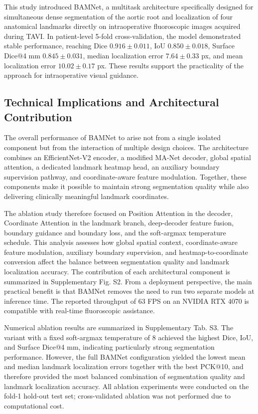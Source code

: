 \documentclass[utf8]{FrontiersinHarvard}
\begin{document}
This study introduced BAMNet, a multitask architecture specifically designed for simultaneous dense segmentation of the aortic 
root and localization of four anatomical landmarks directly on intraoperative fluoroscopic images acquired during TAVI. In 
patient-level 5-fold cross-validation, the model demonstrated stable performance, reaching Dice $0.916 \pm 0.011$, IoU 
$0.850 \pm 0.018$, Surface Dice@4 mm $0.845 \pm 0.031$, median localization error $7.64 \pm 0.33$ px, and mean localization 
error $10.02 \pm 0.17$ px. These results support the practicality of the approach for intraoperative visual guidance.

\subsection{Technical Implications and Architectural Contribution}

The overall performance of BAMNet to arise not from a single isolated component but from the interaction of multiple design 
choices. The architecture combines an EfficientNet-V2 encoder, a modified MA-Net decoder, global spatial attention, a 
dedicated landmark heatmap head, an auxiliary boundary supervision pathway, and coordinate-aware feature modulation. Together, 
these components make it possible to maintain strong segmentation quality while also delivering clinically meaningful landmark coordinates.

The ablation study therefore focused on Position Attention in the decoder, Coordinate Attention in the landmark branch, deep-decoder 
feature fusion, boundary guidance and boundary loss, and the soft-argmax temperature schedule. This analysis assesses how global 
spatial context, coordinate-aware feature modulation, auxiliary boundary supervision, and heatmap-to-coordinate conversion affect 
the balance between segmentation quality and landmark localization accuracy. The contribution of each architectural component is 
summarized in Supplementary Fig. S2. From a deployment perspective, the main practical benefit is that BAMNet removes the need to 
run two separate models at inference time. The reported throughput of 63 FPS on an NVIDIA RTX 4070 is compatible with real-time fluoroscopic assistance.

Numerical ablation results are summarized in Supplementary Tab. S3. The variant with a fixed soft-argmax temperature of 8 achieved 
the highest Dice, IoU, and Surface Dice@4 mm, indicating particularly strong segmentation performance. However, the full BAMNet 
configuration yielded the lowest mean and median landmark localization errors together with the best PCK@10, and therefore provided 
the most balanced combination of segmentation quality and landmark localization accuracy. All ablation experiments were conducted on 
the fold-1 hold-out test set; cross-validated ablation was not performed due to computational cost.
\end{document}
